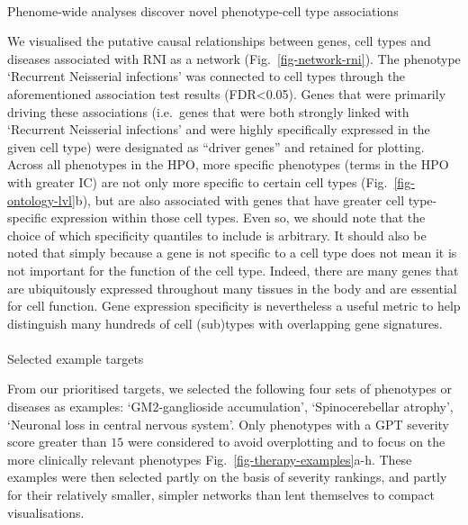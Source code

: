 \documentclass[
]{article}
\makeatletter
\let\oldparagraph\paragraph
\renewcommand{\paragraph}{
    \@ifstar
      \xxxParagraphStar
      \xxxParagraphNoStar
  }
\newcommand{\xxxParagraphStar}[1]{\oldparagraph*{#1}\mbox{}}
\newcommand{\xxxParagraphNoStar}[1]{\oldparagraph{#1}\mbox{}}
\makeatother
\begin{document}
\paragraph{Phenome-wide analyses discover novel phenotype-cell type
associations}\label{phenome-wide-analyses-discover-novel-phenotype-cell-type-associations-1}

We visualised the putative causal relationships between genes, cell
types and diseases associated with RNI as a network
(Fig.~\ref{fig-network-rni}). The phenotype `Recurrent Neisserial
infections' was connected to cell types through the aforementioned
association test results (FDR\textless0.05). Genes that were primarily
driving these associations (i.e.~genes that were both strongly linked
with `Recurrent Neisserial infections' and were highly specifically
expressed in the given cell type) were designated as ``driver genes''
and retained for plotting. Across all phenotypes in the HPO, more
specific phenotypes (terms in the HPO with greater IC) are not only more
specific to certain cell types (Fig.~\ref{fig-ontology-lvl}b), but are
also associated with genes that have greater cell type-specific
expression within those cell types. Even so, we should note that the
choice of which specificity quantiles to include is arbitrary. It should
also be noted that simply because a gene is not specific to a cell type
does not mean it is not important for the function of the cell type.
Indeed, there are many genes that are ubiquitously expressed throughout
many tissues in the body and are essential for cell function. Gene
expression specificity is nevertheless a useful metric to help
distinguish many hundreds of cell (sub)types with overlapping gene
signatures.

\paragraph{Selected example targets}\label{selected-example-targets-1}

From our prioritised targets, we selected the following four sets of
phenotypes or diseases as examples: `GM2-ganglioside accumulation',
`Spinocerebellar atrophy', `Neuronal loss in central nervous system'.
Only phenotypes with a GPT severity score greater than \(15\) were
considered to avoid overplotting and to focus on the more clinically
relevant phenotypes Fig.~\ref{fig-therapy-examples}a-h. These examples
were then selected partly on the basis of severity rankings, and partly
for their relatively smaller, simpler networks than lent themselves to
compact visualisations.
\end{document}
